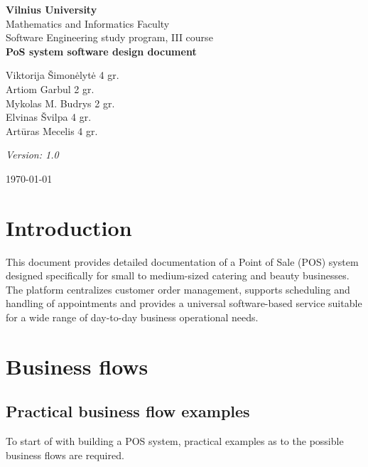 \documentclass[11pt,a4paper,pdftex]{article}
\begin{document}
\begin{titlepage}
    \centering
    \vspace*{2cm}
    
    {\Large \textbf{Vilnius University}}\\[0.5cm]
    {\large Mathematics and Informatics Faculty}\\[0.3cm]
    {\large Software Engineering study program, III course}\\[3cm]
    
    {\Huge \textbf{PoS system software design document}}\\[3cm]
    
    \begin{flushleft}
    Viktorija Šimonėlytė 4 gr. \\
    Artiom Garbul 2 gr. \\
    Mykolas M. Budrys 2 gr. \\
    Elvinas Švilpa 4 gr. \\
    Artūras Mecelis 4 gr. \\
    \end{flushleft}
    
    \vfill

    \textit{Version: 1.0}

    \vspace{1em}
    
    {\large \today}
\end{titlepage}

\tableofcontents
\newpage

\section{Introduction}

This document provides detailed documentation of a Point of Sale (POS) system designed specifically for small to medium-sized catering and beauty businesses. The platform centralizes customer order management, supports scheduling and handling of appointments and provides a universal software-based service suitable for a wide range of day-to-day business operational needs.

\section{Business flows}
\subsection{Practical business flow examples}
To start of with building a POS system, practical examples as to the possible business flows are required.
\end{document}

